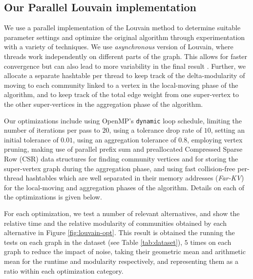 \subsection{Our Parallel Louvain implementation}
\label{sec:louvain}









We use a parallel implementation of the Louvain method to determine suitable parameter settings and optimize the original algorithm through experimentation with a variety of techniques. We use \textit{asynchronous} version of Louvain, where threads work independently on different parts of the graph. This allows for faster convergence but can also lead to more variability in the final result \cite{com-blondel08, com-halappanavar17}. Further, we allocate a separate hashtable per thread to keep track of the delta-modularity of moving to each community linked to a vertex in the local-moving phase of the algorithm, and to keep track of the total edge weight from one super-vertex to the other super-vertices in the aggregation phase of the algorithm.

Our optimizations include using OpenMP's \verb|dynamic| loop schedule, limiting the number of iterations per pass to $20$, using a tolerance drop rate of $10$, setting an initial tolerance of $0.01$, using an aggregation tolerance of $0.8$, employing vertex pruning, making use of parallel prefix sum and preallocated Compressed Sparse Row (CSR) data structures for finding community vertices and for storing the super-vertex graph during the aggregation phase, and using fast collision-free per-thread hashtables which are well separated in their memory addresses (\textit{Far-KV}) for the local-moving and aggregation phases of the algorithm. Details on each of the optimizations is given below.

For each optimization, we test a number of relevant alternatives, and show the relative time and the relative modularity of communities obtained by each alternative in Figure \ref{fig:louvain-opt}. This result is obtained the running the tests on each graph in the dataset (see Table \ref{tab:dataset}), $5$ times on each graph to reduce the impact of noise, taking their geometric mean and arithmetic mean for the runtime and modularity respectively, and representing them as a ratio within each optimization category.

